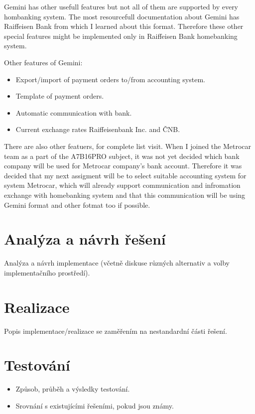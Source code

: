 \documentclass[11pt,twoside,a4paper]{book}
\begin{document}
Gemini has other usefull features but not all of them are supported by every hombanking system. 
The most resourcefull documentation about Gemini has Raiffeisen Bank\cite{rfb} from which I learned about this format.
Therefore these other special features might be implemented only in Raiffeisen Bank homebanking system. 

Other features of Gemini:
\begin{itemize}
	\item Export/import of payment orders to/from accounting system.
	\item Template of payment orders.
	\item Automatic communication with bank.
	\item Current exchange rates Raiffeisenbank Inc. and ČNB.
\end{itemize}
There are also other featuers, for complete list visit\cite{rfb}. When I joined the Metrocar team as a part of the A7B16PRO
subject, it was not yet decided which bank company will be used for Metrocar company's bank account. Therefore it was decided 
that my next assigment will be to select suitable accounting system for system Metrocar, which will already support communication and infromation exchange with homebanking system and that this communication will be using Gemini format and other fotmat too if possible. 

\chapter{Analýza a návrh řešení}
Analýza a návrh implementace (včetně diskuse různých alternativ a volby implementačního prostředí).


\chapter{Realizace}
Popis implementace/realizace se zaměřením na nestandardní části řešení.


\chapter{Testování}

\begin{itemize}
 \item Způsob, průběh a výsledky testování.
 \item Srovnání s existujícími řešeními, pokud jsou známy.
\end{itemize} 
\end{document}
